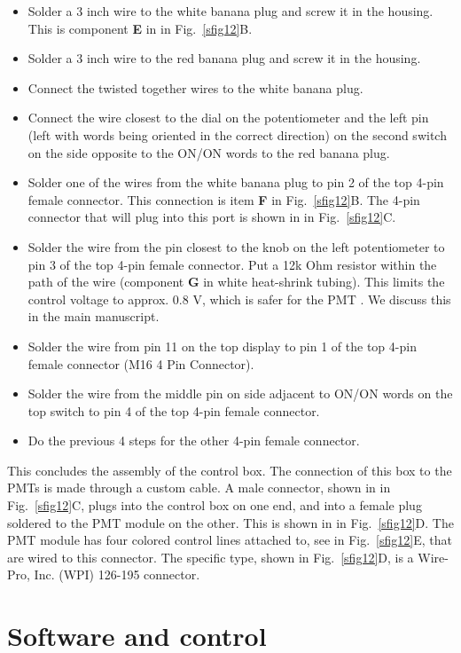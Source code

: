 \documentclass[10pt,letterpaper]{article}
\begin{document}
\begin{itemize}
    \item Solder a 3 inch wire to the white banana plug and screw it in the housing. This is component \textbf{E} in in Fig.~\ref{sfig12}B.
    \item Solder a 3 inch wire to the red banana plug and screw it in the housing.
    \item Connect the twisted together wires to the white banana plug.
    \item Connect the wire closest to the dial on the potentiometer and the left pin (left with words being oriented in the correct direction) on the second switch on the side opposite to the ON/ON words to the red banana plug.
    \item Solder one of the wires from the white banana plug to pin 2 of the top 4-pin female connector. This connection is item \textbf{F} in Fig.~\ref{sfig12}B. The 4-pin connector that will plug into this port is shown in in Fig.~\ref{sfig12}C.
    \item Solder the wire from the pin closest to the knob on the left potentiometer to pin 3 of the top 4-pin female connector. Put a 12k Ohm resistor within the path of the wire (component \textbf{G} in white heat-shrink tubing). This limits the control voltage to approx. 0.8 V, which is safer for the PMT \cite{Hamamatsu2024}. We discuss this in the main manuscript.
    \item Solder the wire from pin 11 on the top display to pin 1 of the top 4-pin female connector (M16 4 Pin Connector).
    \item Solder the wire from the middle pin on side adjacent to ON/ON words on the top switch to pin 4 of the top 4-pin female connector.
    \item Do the previous 4 steps for the other 4-pin female connector.
\end{itemize}
%
This concludes the assembly of the control box. The connection of this box to the PMTs is made through a custom cable. A male connector, shown in in Fig.~\ref{sfig12}C, plugs into the control box on one end, and into a female plug soldered to the PMT module on the other. This is shown in in Fig.~\ref{sfig12}D. The PMT module has four colored control lines attached to, see in Fig.~\ref{sfig12}E, that are wired to this connector. The specific type, shown in Fig.~\ref{sfig12}D, is a Wire-Pro, Inc. (WPI) 126-195 connector.

\section{Software and control}
%
\end{document}
